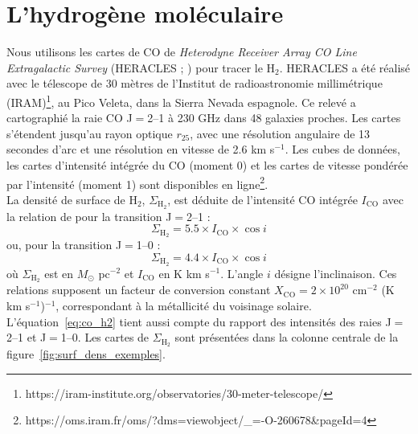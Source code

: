 \section{L'hydrogène moléculaire}

Nous utilisons les cartes de CO de \textit{Heterodyne Receiver Array CO Line Extragalactic Survey} (HERACLES ; \citealt{leroy2009}) pour tracer le H$_2$. HERACLES a été réalisé avec le télescope de 30 mètres de l'Institut de radioastronomie millimétrique (IRAM)\footnote{https://iram-institute.org/observatories/30-meter-telescope/}, au Pico Veleta, dans la Sierra Nevada espagnole. Ce relevé a cartographié la raie CO J$=$2--1 à 230 GHz dans 48 galaxies proches. Les cartes s'étendent jusqu'au rayon optique $r_{25}$, avec une résolution angulaire de 13 secondes d'arc et une résolution en vitesse de 2.6 km s$^{-1}$. Les cubes de données, les cartes d'intensité intégrée du CO (moment 0) et les cartes de vitesse pondérée par l'intensité (moment 1) sont disponibles en ligne\footnote{https://oms.iram.fr/oms/?dms=viewobject/\_=-O-260678\&pageId=4}.\\\indent
La densité de surface de H$_2$, $\Sigma_{\mathrm{H}_2}$, est déduite de l'intensité CO intégrée $I_{\mathrm{CO}}$ avec la relation de \citet{Leroy2008} pour la transition J$=$2--1 :
\begin{equation}
	\Sigma_{\mathrm{H}_2} = 5.5 \times I_{\mathrm{CO}} \times \cos i
	\label{eq:co_h2}
\end{equation}
\noindent ou, pour la transition J$=$1--0 :
\begin{equation}
	\Sigma_{\mathrm{H}_2} = 4.4 \times I_{\mathrm{CO}} \times \cos i
	\label{eq:co10_h2}
\end{equation}
\noindent où $\Sigma_{\mathrm{H}_2}$ est en $M_\odot$ pc$^{-2}$ et $I_{\mathrm{CO}}$ en K km s$^{-1}$. L'angle $i$ désigne l'inclinaison. Ces relations supposent un facteur de conversion constant $X_{\mathrm{CO}} = 2 \times 10^{20}$ cm$^{-2}$ (K km s$^{-1}$)$^{-1}$, correspondant à la métallicité du voisinage solaire. L'équation~\ref{eq:co_h2} tient aussi compte du rapport des intensités des raies J$=$2--1 et J$=$1--0. Les cartes de $\Sigma_{\mathrm{H}_2}$ sont présentées dans la colonne centrale de la figure~\ref{fig:surf_dens_exemples}.

